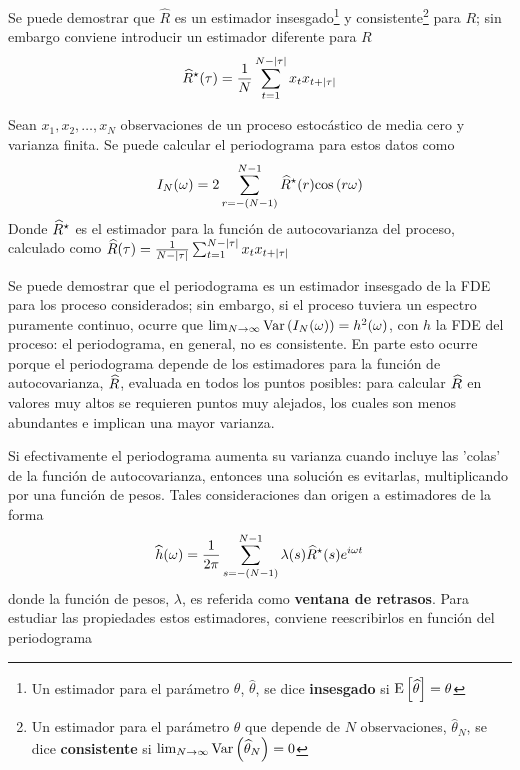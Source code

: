 Se puede demostrar que $\widehat{R}$ es un estimador insesgado\footnote{Un estimador para el 
par\'ametro $\theta$, $\widehat{\theta}$, se dice \textbf{insesgado} si 
$\mathrm{E}\left[ \widehat{\theta} \right]=\theta$} y consistente\footnote{Un estimador para el par\'ametro $\theta$ que 
depende de $N$ observaciones, 
$\widehat{\theta}_N$, se dice \textbf{consistente} si 
$\lim_{N\rightarrow \infty} \mathrm{Var}\left( \widehat{\theta}_N \right) = 0$} 
para $R$; sin embargo conviene introducir un estimador diferente para $R$
\begin{equation*}
\widehat{ R }^{\star}(\tau) = \frac{1}{N} 
\sum_{t = 1}^{N-\left| \tau \right|} x_t x_{t+\left| \tau \right|}
\label{estimador_R_ast}
\end{equation*}

\begin{teorema}
Sean $x_1, x_2 , \dots, x_N$ observaciones de un proceso estoc\'astico de media cero y varianza
finita. Se puede calcular el periodograma para estos datos como
\begin{equation*}
I_N(\omega) = 2 \sum_{r = -(N-1)}^{N-1} \widehat{ R }^{\star}(r) \mathrm{cos}\left( r \omega \right)
\end{equation*}
Donde $\widehat{ R }^{\star}$ es el estimador para la funci\'on de autocovarianza del proceso, calculado como
$\widehat{R}(\tau) = \frac{1}{N-\left| \tau \right|} \sum_{t = 1}^{N-\left| \tau \right|} x_t x_{t+\left| \tau \right|}$
\label{periodograma_rho}
\end{teorema}

Se puede demostrar que el periodograma es un estimador insesgado de la FDE para los proceso 
considerados; sin embargo, si el proceso tuviera un espectro puramente continuo, ocurre que 
$\lim_{N\rightarrow \infty} \mathrm{Var}\left( I_N(\omega) \right) = h^{2}(\omega)$, con $h$ la FDE del proceso: el 
periodograma, en general, no es consistente.
En parte esto ocurre porque el periodograma depende de los estimadores para la funci\'on de 
autocovarianza, $\widehat{ R }$, evaluada en todos los puntos posibles: para calcular $\widehat{ R }$ en 
valores muy altos se requieren puntos muy alejados, los cuales son menos abundantes e implican 
una mayor varianza.

Si efectivamente el periodograma aumenta su varianza cuando incluye las 'colas' de la funci\'on de 
autocovarianza, entonces una soluci\'on es evitarlas, multiplicando por una funci\'on de pesos. 
Tales consideraciones dan origen a estimadores de la forma
\begin{equation*}
\widehat{ h }(\omega) = \frac{1}{2\pi} \sum_{s = -(N-1)}^{N-1} 
\lambda(s) \widehat{ R }^{\star}(s) e^{i \omega t}
\label{ventaneando}
\end{equation*}
donde la funci\'on de pesos, $\lambda$, es referida como \textbf{ventana de retrasos}. Para 
estudiar las propiedades estos estimadores, conviene reescribirlos en funci\'on del periodograma

